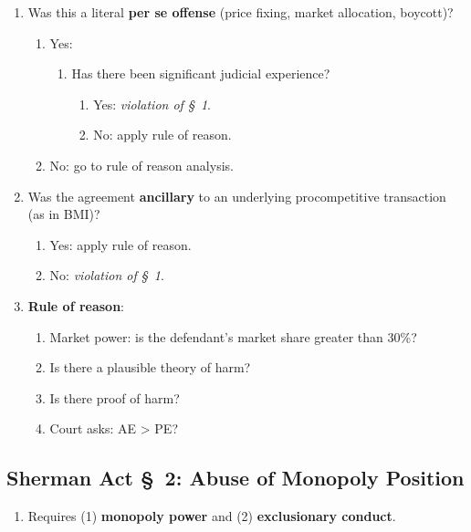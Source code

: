 \begin{enumerate}
    \item Was this a literal \textbf{per se offense} (price fixing, market 
    allocation, boycott)?
    \begin{enumerate}
        \item Yes:
        \begin{enumerate}
            \item Has there been significant judicial experience?
            \begin{enumerate}
                \item Yes: \emph{violation of \S\ 1}.
                \item No: apply rule of reason.
            \end{enumerate}
        \end{enumerate}
        \item No: go to rule of reason analysis.
    \end{enumerate}
    \item Was the agreement \textbf{ancillary} to an underlying procompetitive 
    transaction (as in BMI)?
    \begin{enumerate}
        \item Yes: apply rule of reason.
        \item No: \emph{violation of \S\ 1}.
    \end{enumerate}
    \item \textbf{Rule of reason}:
    \begin{enumerate}
        \item Market power: is the defendant's market share greater than 30\%?
        \item Is there a plausible theory of harm?
        \item Is there proof of harm?
        \item Court asks: AE > PE?
    \end{enumerate}
\end{enumerate}

\subsection{Sherman Act \S\ 2: Abuse of Monopoly Position}

\begin{enumerate}
    \item Requires (1) \textbf{monopoly power} and (2) \textbf{exclusionary 
    conduct}.
\end{enumerate}


